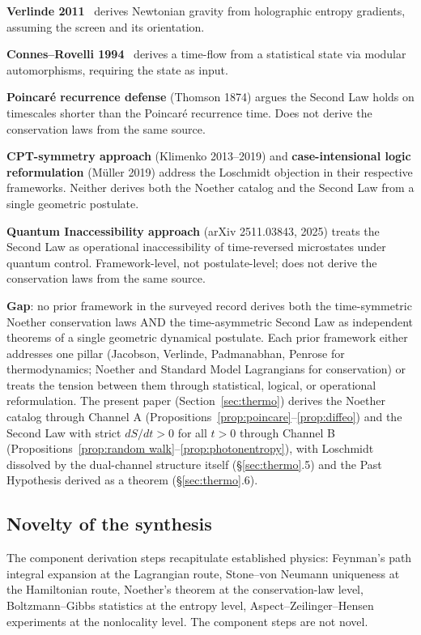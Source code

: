 \documentclass[11pt,a4paper]{article}
\begin{document}
\textbf{Verlinde 2011}~\cite{verlinde2011} derives Newtonian gravity from holographic entropy gradients, assuming the screen and its orientation.

\textbf{Connes--Rovelli 1994}~\cite{connesrovelli1994} derives a time-flow from a statistical state via modular automorphisms, requiring the state as input.

\textbf{Poincar\'e recurrence defense} (Thomson 1874) argues the Second Law holds on timescales shorter than the Poincar\'e recurrence time. Does not derive the conservation laws from the same source.

\textbf{CPT-symmetry approach} (Klimenko 2013--2019) and \textbf{case-intensional logic reformulation} (M\"uller 2019) address the Loschmidt objection in their respective frameworks. Neither derives both the Noether catalog and the Second Law from a single geometric postulate.

\textbf{Quantum Inaccessibility approach} (arXiv 2511.03843, 2025) treats the Second Law as operational inaccessibility of time-reversed microstates under quantum control. Framework-level, not postulate-level; does not derive the conservation laws from the same source.

\textbf{Gap}: no prior framework in the surveyed record derives both the time-symmetric Noether conservation laws AND the time-asymmetric Second Law as independent theorems of a single geometric dynamical postulate. Each prior framework either addresses one pillar (Jacobson, Verlinde, Padmanabhan, Penrose for thermodynamics; Noether and Standard Model Lagrangians for conservation) or treats the tension between them through statistical, logical, or operational reformulation. The present paper (Section~\ref{sec:thermo}) derives the Noether catalog through Channel A (Propositions~\ref{prop:poincare}--\ref{prop:diffeo}) and the Second Law with strict $dS/dt > 0$ for all $t > 0$ through Channel B (Propositions~\ref{prop:random walk}--\ref{prop:photonentropy}), with Loschmidt dissolved by the dual-channel structure itself (\S\ref{sec:thermo}.5) and the Past Hypothesis derived as a theorem (\S\ref{sec:thermo}.6).

\subsection{Novelty of the synthesis}

The component derivation steps recapitulate established physics: Feynman's path integral expansion at the Lagrangian route, Stone--von Neumann uniqueness at the Hamiltonian route, Noether's theorem at the conservation-law level, Boltzmann--Gibbs statistics at the entropy level, Aspect--Zeilinger--Hensen experiments at the nonlocality level. The component steps are not novel.
\end{document}
